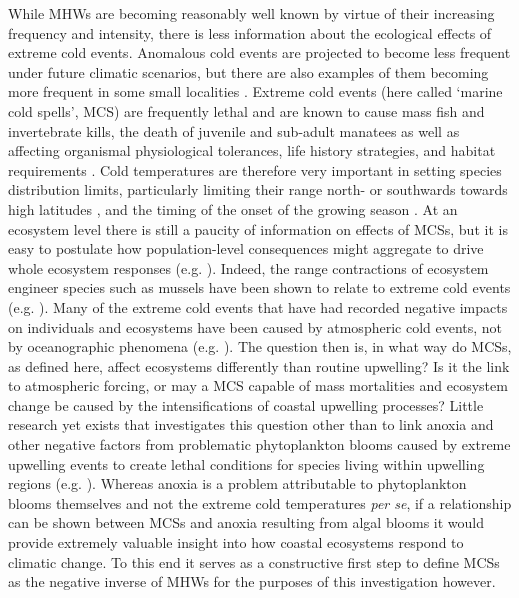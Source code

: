 \documentclass[a4paper,10pt,review]{elsarticle}
\begin{document}
While MHWs are becoming reasonably well known by virtue of their increasing frequency and intensity, there is less information about the ecological effects of extreme cold events. Anomalous cold events are projected to become less frequent under future climatic scenarios, but there are also examples of them becoming more frequent in some small localities \cite{Gershunov2008, Matthes2015}. Extreme cold events (here called ‘marine cold spells’, MCS) are frequently lethal \cite{Woodward1987} and are known to cause mass fish \cite{Gunter1941, Gunter1951, Holt1983} and invertebrate \cite{Gunter1951, Crisp1964} kills, the death of juvenile and sub-adult manatees \cite{OShea1985, Marsh1986} as well as affecting organismal physiological tolerances, life history strategies, and habitat requirements \cite{Ellis2015}. Cold temperatures are therefore very important in setting species distribution limits, particularly limiting their range north- or southwards towards high latitudes \cite{Firth2011}, and the timing of the onset of the growing season \cite{Jentsch2007}. At an ecosystem level there is still a paucity of information on effects of MCSs, but it is easy to postulate how population-level consequences might aggregate to drive whole ecosystem responses (e.g. \cite{Kreyling2008, Rehage2016}). Indeed, the range contractions of ecosystem engineer species such as mussels have been shown to relate to extreme cold events (e.g. \cite{Firth2011, Firth2015}). Many of the extreme cold events that have had recorded negative impacts on individuals and ecosystems have been caused by atmospheric cold events, not by oceanographic phenomena (e.g. \cite{Gunter1941, Firth2011}). The question then is, in what way do MCSs, as defined here, affect ecosystems differently than routine upwelling? Is it the link to atmospheric forcing, or may a MCS capable of mass mortalities and ecosystem change be caused by the intensifications of coastal upwelling processes? Little research yet exists that investigates this question other than to link anoxia and other negative factors from problematic phytoplankton blooms caused by extreme upwelling events to create lethal conditions for species living within upwelling regions (e.g. \cite{Laboy-nieves2001}). Whereas anoxia is a problem attributable to phytoplankton blooms themselves \cite{Diaz2008} and not the extreme cold temperatures \textit{per se}, if a relationship can be shown between MCSs and anoxia resulting from algal blooms it would provide extremely valuable insight into how coastal ecosystems respond to climatic change. To this end it serves as a constructive first step to define MCSs as the negative inverse of MHWs for the purposes of this investigation however.
\end{document}
